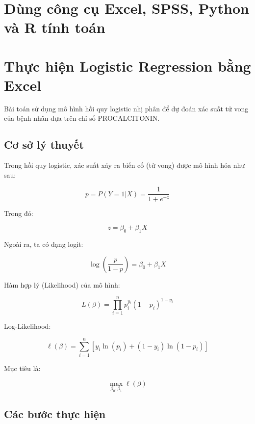 \newpage
\section*{Dùng công cụ Excel, SPSS, Python và R tính toán}

\section{Thực hiện Logistic Regression bằng Excel}

Bài toán sử dụng mô hình hồi quy logistic nhị phân để dự đoán xác suất tử vong của bệnh nhân dựa trên chỉ số PROCALCITONIN.

\subsection{Cơ sở lý thuyết}

Trong hồi quy logistic, xác suất xảy ra biến cố (tử vong) được mô hình hóa như sau:

\[
p = P(Y=1|X) = \frac{1}{1 + e^{-z}}
\]

Trong đó:

\[
z = \beta_0 + \beta_1 X
\]

Ngoài ra, ta có dạng logit:

\[
\log\left(\frac{p}{1-p}\right) = \beta_0 + \beta_1 X
\]

Hàm hợp lý (Likelihood) của mô hình:

\[
L(\beta) = \prod_{i=1}^{n} p_i^{y_i} (1-p_i)^{1-y_i}
\]

Log-Likelihood:

\[
\ell(\beta) = \sum_{i=1}^{n} \left[ y_i \ln(p_i) + (1-y_i)\ln(1-p_i) \right]
\]

Mục tiêu là:

\[
\max_{\beta_0, \beta_1} \ell(\beta)
\]

\subsection{Các bước thực hiện}


